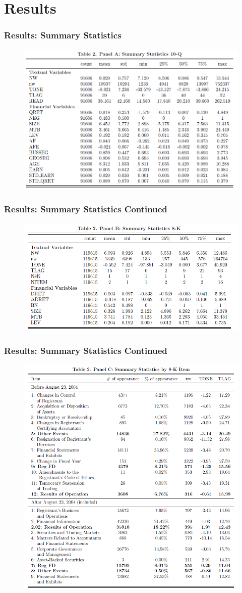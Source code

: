 \documentclass{beamer}
\begin{document}
\section{Results}
\begin{frame}
\frametitle{Results: Summary Statistics}
\begin{figure}[h]
	\centering
	\includegraphics[width=0.65\linewidth]{tab2panA}
	\label{tab2panA}
\end{figure}

\end{frame}
\begin{frame}
	\frametitle{Results: Summary Statistics Continued}
	\begin{figure}[h]
		\centering
		\includegraphics[width=0.65\linewidth]{tab2panB}
		\label{tab2panB}
	\end{figure}
	
\end{frame}
\begin{frame}
	\frametitle{Results: Summary Statistics Continued}
	\begin{figure}[h]
		\centering
		\includegraphics[width=0.6\linewidth]{tab2panC}
		\label{tab2panC}
	\end{figure}
	
\end{frame}
\end{document}
